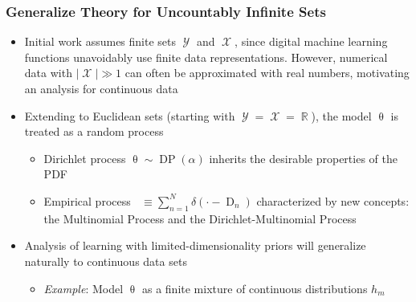 \documentclass[aspectratio=169,usenames,dvipsnames]{beamer}
\DeclareMathOperator{\Drm}{\mathrm{D}}
\DeclareMathOperator{\nbarrm}{\bar{\mathrm{n}}}
\DeclareMathOperator{\Xcal}{\mathcal{X}}
\DeclareMathOperator{\Ycal}{\mathcal{Y}}
\DeclareMathOperator{\Rbb}{\mathbb{R}}
\DeclareMathOperator{\DP}{\mathrm{DP}}
\begin{document}
\begin{frame}
\frametitle{Generalize Theory for Uncountably Infinite Sets}

\begin{itemize}
\item Initial work assumes finite sets $\Ycal$ and $\Xcal$, since digital machine learning functions unavoidably use finite data representations. However, numerical data with $|\Xcal| \gg 1$ can often be approximated with real numbers, motivating an analysis for \alert{continuous data}
\vspace{0.5em}
\item Extending to Euclidean sets (starting with $\Ycal = \Xcal = \Rbb$), the model $\uptheta$ is treated as a \alert{random process}
	\vspace{0.25em}
	\begin{itemize}
	\item Dirichlet process $\uptheta \sim \DP(\alpha)$ inherits the desirable properties of the PDF \cite{bishop}
	\vspace{0.25em}
	\item Empirical process $\nbarrm \equiv \sum_{n=1}^N \delta\left( \cdot - \Drm_n \right)$ characterized by new concepts: the \alert{Multinomial Process} and the \alert{Dirichlet-Multinomial Process}
	\end{itemize}
\vspace{0.5em}
\item Analysis of learning with limited-dimensionality priors will generalize naturally to continuous data sets
	\vspace{0.25em}
	\begin{itemize}
	\item \emph{Example}: Model $\uptheta$ as a finite mixture of continuous distributions $h_m$
	\end{itemize}
\end{itemize}

\end{frame}
\end{document}
